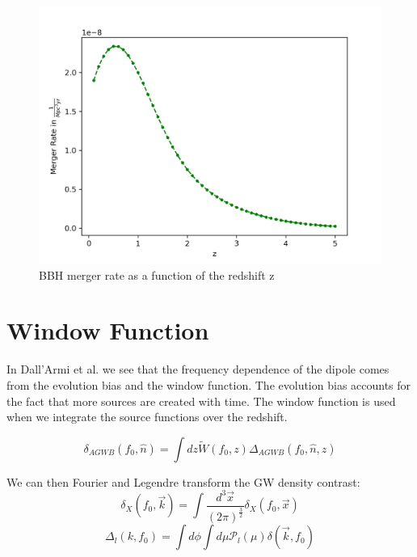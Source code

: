 \begin{figure}[h]
    \centering
    \includegraphics[width=1\linewidth]{Images/bbh_merger_rate.png}
    \caption{BBH merger rate as a function of the redshift z}
    \label{bbh_merger_rate}
   \end{figure} 


\section{Window Function}
\label{window_fct_section}

In Dall'Armi et al. \cite{dallarmi_dipole_2022} we see that the frequency dependence 
of the dipole comes from the evolution bias and the window function. The evolution 
bias accounts for the fact that more sources are created with time. The window 
function is used when we integrate the source functions over the redshift. 

\begin{equation}
\label{window_fct_int}
    \delta_{AGWB}(f_0, \hat{n})=\int dz \tilde{W}(f_0, z)\Delta_{AGWB}(f_0, \hat{n}, z)
\end{equation}


We can then Fourier and Legendre transform the GW density contrast:
\begin{equation}
    \delta_X(f_0, \vec{k}) = \int \frac{d^3\vec{x}}{(2\pi)^\frac{3}{2}} 
    \delta_X(f_0, \vec{x})
\end{equation}
\begin{equation}
    \Delta_l(k, f_0) = \int d\phi \int d\mu \mathcal{P}_l(\mu) 
    \delta(\vec{k}, f_0)
\end{equation}


